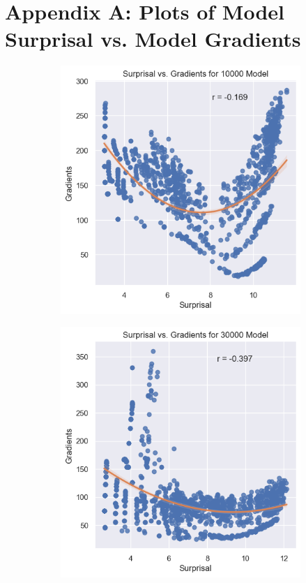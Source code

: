 \documentclass{IEEEtran}
\begin{document}
\section*{Appendix A: Plots of Model Surprisal vs. Model Gradients}
\begin{figure}[h]
    \centering
    \begin{subfigure}{0.4\textwidth}
        \centering
        \includegraphics[width=\textwidth]{surprisal_vs_gradients/10000.png}
    \end{subfigure}
    \begin{subfigure}{0.4\textwidth}
        \centering
        \includegraphics[width=\textwidth]{surprisal_vs_gradients/30000.png}
    \end{subfigure}
\end{figure}
\end{document}
